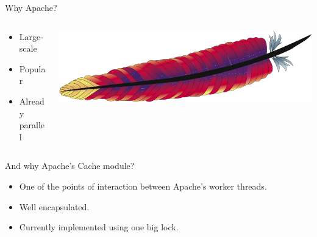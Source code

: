\documentclass[]{beamer}
\begin{document}
\begin{frame}{Why Apache?}
\begin{columns}[T]
\begin{column}{5cm}
\begin{itemize}
\item Large-scale
\item Popular
\item Already parallel
\end{itemize}
\end{column}
\begin{column}{5cm}
\includegraphics[width=\textwidth]{../apache_feather.png}
\end{column}
\end{columns}
\vspace{10pt}
\pause
And why Apache's Cache module?
\begin{itemize}
\item One of the points of interaction between Apache's worker threads.
\item Well encapsulated.
\item Currently implemented using one big lock.
\end{itemize}
\end{frame}
\end{document}
